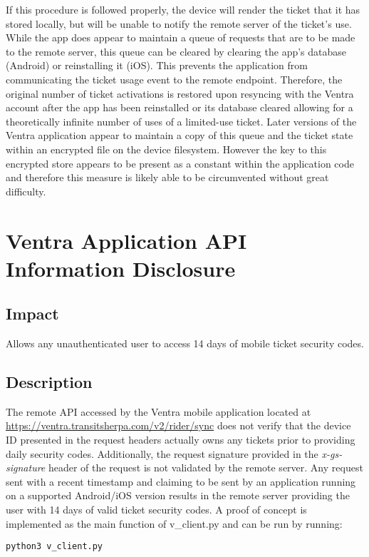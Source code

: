 \documentclass[12pt,conference]{IEEEtran}
\begin{document}
If this procedure is followed properly, the device will render the ticket that it has stored locally, but will be unable to notify the remote server of the ticket's use. While the app does appear to maintain a queue of requests that are to be made to the remote server, this queue can be cleared by clearing the app's database (Android) or reinstalling it (iOS). This prevents the application from communicating the ticket usage event to the remote endpoint. Therefore, the original number of ticket activations is restored upon resyncing with the Ventra account after the app has been reinstalled or its database cleared allowing for a theoretically infinite number of uses of a limited-use ticket. Later versions of the Ventra application appear to maintain a copy of this queue and the ticket state within an encrypted file on the device filesystem. However the key to this encrypted store appears to be present as a constant within the application code and therefore this measure is likely able to be circumvented without great difficulty.

\section{Ventra Application API Information Disclosure}

\subsection{Impact}
Allows any unauthenticated user to access 14 days of mobile ticket security codes.

\subsection{Description}
The remote API accessed by the Ventra mobile application located at \url{https://ventra.transitsherpa.com/v2/rider/sync} does not verify that the device ID presented in the request headers actually owns any tickets prior to providing daily security codes. Additionally, the request signature provided in the \emph{x-gs-signature} header of the request is not validated by the remote server. Any request sent with a recent timestamp and claiming to be sent by an application running on a supported Android/iOS version results in the remote server providing the user with 14 days of valid ticket security codes. A proof of concept is implemented as the main function of v\_client.py and can be run by running:
\begin{lstlisting}
python3 v_client.py
\end{lstlisting}
\end{document}
